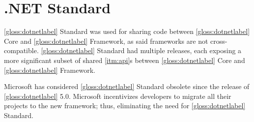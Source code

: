 \section{.NET Standard} \label{sec:netStandard}
\ref{gloss:dotnetlabel} Standard was used for sharing code between \ref{gloss:dotnetlabel} Core and \ref{gloss:dotnetlabel} Framework, as said frameworks are not cross-compatible. \ref{gloss:dotnetlabel} Standard had multiple releases, each exposing a more significant subset of shared \ref{itm:api}s between \ref{gloss:dotnetlabel} Core and \ref{gloss:dotnetlabel} Framework.

Microsoft has considered \ref{gloss:dotnetlabel} Standard obsolete since the release of \ref{gloss:dotnetlabel} 5.0. Microsoft incentivizes developers to migrate all their projects to the new framework; thus, eliminating the need for \ref{gloss:dotnetlabel} Standard.